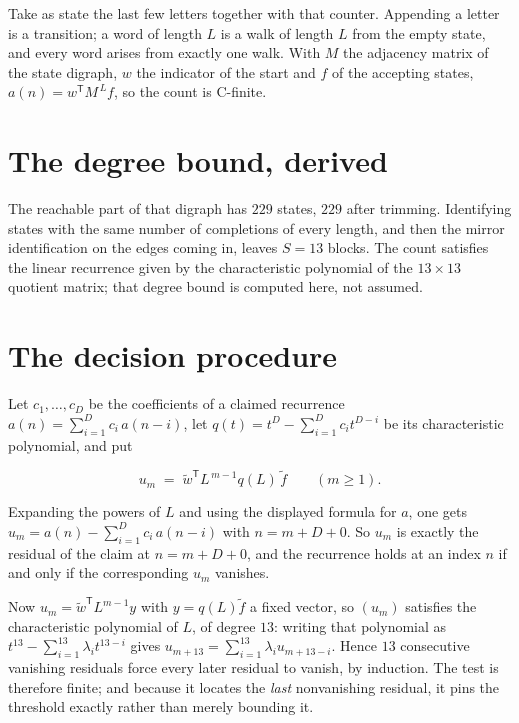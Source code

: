\documentclass[11pt]{article}
\theoremstyle{definition}
\begin{document}
Take as state the last few letters together with that counter. Appending a letter is a transition; a word of length $L$ is a walk of length $L$ from the empty state, and every word arises from exactly one walk. With $M$ the adjacency matrix of the state digraph, $w$ the indicator of the start and $f$ of the accepting states, $a(n) = w^{\mathsf T}M^{\,L}f$, so the count is C-finite.

\section{The degree bound, derived}

The reachable part of that digraph has $229$ states, $229$ after trimming. Identifying states with the same number of completions of every length, and then the mirror identification on the edges coming in, leaves $S = 13$ blocks. The count satisfies the linear recurrence given by the characteristic polynomial of the $13\times13$ quotient matrix; that degree bound is computed here, not assumed.

\section{The decision procedure}

Let $c_1,\dots,c_D$ be the coefficients of a claimed recurrence $a(n) = \sum_{i=1}^{D} c_i\,a(n-i)$, let $q(t) = t^{D} - \sum_{i=1}^{D} c_i t^{D-i}$ be its characteristic polynomial, and put

\[u_m \;=\; \tilde w^{\mathsf T} L^{\,m-1} q(L)\,\tilde f \qquad (m \ge 1).\]

Expanding the powers of $L$ and using the displayed formula for $a$, one gets $u_m = a(n) - \sum_{i=1}^{D} c_i\,a(n-i)$ with $n = m + D + 0$. So $u_m$ is exactly the residual of the claim at $n = m + D + 0$, and the recurrence holds at an index $n$ if and only if the corresponding $u_m$ vanishes.

Now $u_m = \tilde w^{\mathsf T} L^{m-1} y$ with $y = q(L)\tilde f$ a fixed vector, so $(u_m)$ satisfies the characteristic polynomial of $L$, of degree $13$: writing that polynomial as $t^{13} - \sum_{i=1}^{13} \lambda_i t^{13-i}$ gives $u_{m+13} = \sum_{i=1}^{13} \lambda_i u_{m+13-i}$. Hence $13$ consecutive vanishing residuals force every later residual to vanish, by induction. The test is therefore finite; and because it locates the {\itshape last} nonvanishing residual, it pins the threshold exactly rather than merely bounding it.
\end{document}

